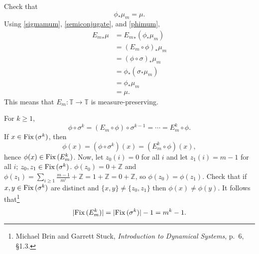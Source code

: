 \documentclass{article}
\newcommand{\Fix}{\ensuremath\mathrm{Fix}\,}
\theoremstyle{definition}
\begin{document}
Check that 
\begin{equation}
\phi_* \mu_m = \mu.
\label{phimum}
\end{equation}
Using \eqref{sigmamum},  \eqref{semiconjugate}, and \eqref{phimum},
\begin{align*}
{E_m}_*\mu &={E_m}_*(\phi_* \mu_m)\\
&=(E_m \circ \phi)_* \mu_m\\
&=(\phi \circ \sigma)_* \mu_m\\
&=\phi_* (\sigma_* \mu_m)\\
&=\phi_* \mu_m\\
&=\mu.
\end{align*}
This means that $E_m:\mathbb{T} \to \mathbb{T}$ is measure-preserving.


For $k \geq 1$,
\[
\phi \circ \sigma^k = (E_m \circ \phi) \circ \sigma^{k-1} = \cdots = E_m^k \circ \phi. 
\]
If $x \in \Fix(\sigma^k)$, then
\[
\phi(x) = (\phi \circ \sigma^k)(x) = (E_m^k \circ \phi)(x),
\]
hence $\phi(x) \in \Fix(E_m^k)$. 
Now, let $z_0(i)=0$ for all $i$ and let $z_1(i)=m-1$ for all $i$; $z_0,z_1 \in \Fix(\sigma^k)$. $\phi(z_0)=0 + \mathbb{Z}$ and 
$\phi(z_1) = \sum_{i \geq 1} \frac{m-1}{m^i} + \mathbb{Z} = 1 + \mathbb{Z} = 0+\mathbb{Z}$, so $\phi(z_0)=\phi(z_1)$. 
Check that if $x,y \in \Fix(\sigma^k)$ are distinct and $\{x,y\} \neq \{z_0,z_1\}$ then $\phi(x) \neq \phi(y)$. 
It follows that\footnote{Michael Brin and Garrett Stuck, {\em Introduction to Dynamical Systems}, p.~6, \S 1.3.}
\[
|\Fix(E_m^k)| = |\Fix(\sigma^k)| - 1 = m^k-1.
\]
 
\end{document}

